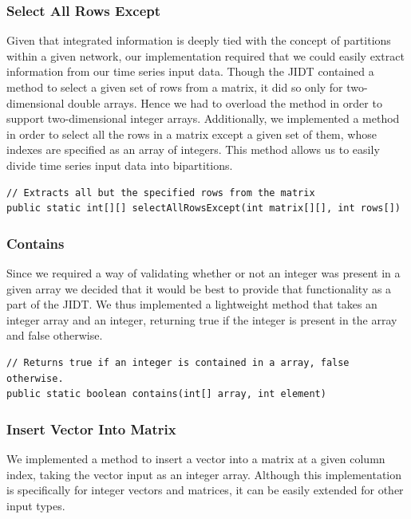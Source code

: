 \documentclass[a4paper,11pt]{article}
\begin{document}
\subsubsection{Select All Rows Except}

Given that integrated information is deeply tied with the concept of partitions within a given network, our implementation required that we could easily extract information from our time series input data. Though the JIDT contained a method to select a given set of rows from a matrix, it did so only for two-dimensional double arrays. Hence we had to overload the method in order to support two-dimensional integer arrays. Additionally, we implemented a method in order to select all the rows in a matrix except a given set of them, whose indexes are specified as an array of integers. This method allows us to easily divide time series input data into bipartitions. 

\begin{verbatim}
// Extracts all but the specified rows from the matrix
public static int[][] selectAllRowsExcept(int matrix[][], int rows[])
\end{verbatim}

\subsubsection{Contains}

Since we required a way of validating whether or not an integer was present in a given array we decided that it would be best to provide that functionality as a part of the JIDT. We thus implemented a lightweight method that takes an integer array and an integer, returning true if the integer is present in the array and false otherwise.

\begin{verbatim}
// Returns true if an integer is contained in a array, false otherwise.
public static boolean contains(int[] array, int element)
\end{verbatim}

\subsubsection{Insert Vector Into Matrix}

We implemented a method to insert a vector into a matrix at a given column index, taking the vector input as an integer array. Although this implementation is specifically for integer vectors and matrices, it can be easily extended for other input types.
\end{document}
